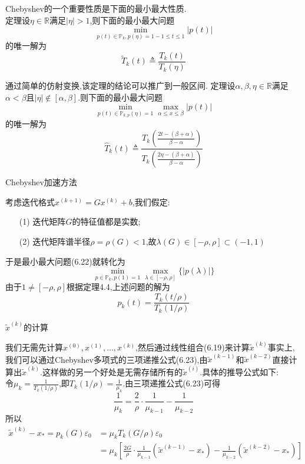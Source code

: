 \documentclass[notheorems,serif]{beamer}
\renewcommand{\normalsize}{\wuhao}
\newcommand{\wuhao}{\fontsize{10.5pt}{\baselineskip}\selectfont}
\begin{document}
\begin{frame}
Chebyshev的一个重要性质是下面的最小最大性质.\\
{\color{blue}定理}设$\eta \in \mathbb{R}$满足$|\eta|>1$,则下面的最小最大问题
$$
\min _{p(t) \in \mathbb{P}_{k}, p(\eta)=1-1 \leq t \leq 1}|p(t)|
$$
的唯一解为
$$
\tilde{T}_{k}(t) \triangleq \frac{T_{k}(t)}{T_{k}(\eta)}
$$
\end{frame}

\begin{frame}
通过简单的仿射变换,该定理的结论可以推广到一般区间.
{\color{blue}定理}\qquad 设$\alpha, \beta, \eta \in \mathbb{R}$满足$\alpha<\beta$且$|\eta| \notin[\alpha, \beta]$.则下面的最小最大问题
$$
\min _{p(t) \in \mathbb{P}_{k, p}(\eta)=1} \max _{\alpha \leq x \leq \beta}|p(t)|
$$
的唯一解为
$$
\hat{T}_{k}(t) \triangleq \frac{T_{k}\left(\frac{2 t-(\beta+\alpha)}{\beta-\alpha}\right)}{T_{k}\left(\frac{2 \eta-(\beta+\alpha)}{\beta-\alpha}\right)}
$$
\end{frame}

\begin{frame}


{\color{blue}\Large Chebyshev加速方法}

\quad

\normalsize
考虑迭代格式$x^(k+1)=Gx^(k)+b$,我们假定:
\begin{itemize}
\item[(1)]迭代矩阵$G$的特征值都是实数;
\item[(2)]迭代矩阵谱半径$\rho=\rho(G)<1$,故$\lambda(G) \in[-\rho, \rho] \subset(-1,1)$
\end{itemize}

于是最小最大问题(6.22)就转化为
$$
\min _{p \in \mathbb{P}_{k}, p(1)=1} \max _{\lambda \in[-\rho, \rho]}\{|p(\lambda)|\}
$$
由于$1 \neq[-\rho, \rho]$根据定理4.4,上述问题的解为
$$
p_{k}(t)=\frac{T_{k}(t / \rho)}{T_{k}(1 / \rho)}
$$
\end{frame}

\begin{frame}


{\color{blue}\Large $\tilde{x}^{(k)}$的计算}

\quad

\normalsize
我们无需先计算$x^{(0)}, x^{(1)}, \ldots, x^{(k)}$,然后通过线性组合(6.19)来计算$\tilde{x}^{(k)}$事实上,我们可以通过Chebyshev多项式的三项递推公式(6.23),由$\tilde{x}^{(k-1)}$和$\tilde{x}^{(k-2)}$直接计算出$\tilde{x}^{(k)}$.这样做的另一个好处是无需存储所有的$\tilde{x}^{(i)}$.具体的推导公式如下:\\
令$\mu_{k}=\frac{1}{T_{k}(1 / \rho)}$,即$T_{k}(1 / \rho)=\frac{1}{\mu_{k}}$.由三项递推公式(6.23)可得
$$
\frac{1}{\mu_{k}}=\frac{2}{\rho} \cdot \frac{1}{\mu_{k-1}}-\frac{1}{\mu_{k-2}}
$$
所以
$$
\begin{aligned} \tilde{x}^{(k)}-x_{*}=p_{k}(G) \varepsilon_{0} &=\mu_{k} T_{k}(G / \rho) \varepsilon_{0} \\ &=\mu_{k}\left[\frac{2 G}{\rho} \cdot \frac{1}{\mu_{k-1}}\left(\tilde{x}^{(k-1)}-x_{*}\right)-\frac{1}{\mu_{k-2}}\left(\tilde{x}^{(k-2)}-x_{*}\right)\right] \end{aligned}
$$
\end{frame}
\end{document}
